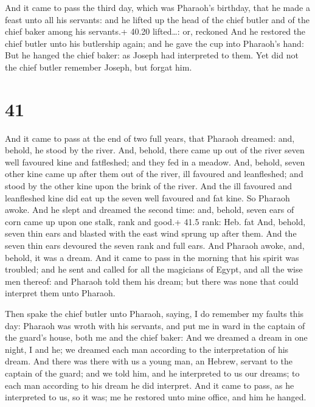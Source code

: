  And it came to pass the third day, which was Pharaoh's
birthday, that he made a feast unto all his servants: and he lifted up
the head of the chief butler and of the chief baker among his servants.+
40.20 lifted\ldots: or, reckoned  And he restored the chief
butler unto his butlership again; and he gave the cup into Pharaoh's
hand:  But he hanged the chief baker: as Joseph had
interpreted to them.  Yet did not the chief butler remember
Joseph, but forgat him.

\hypertarget{section-40}{%
\section{41}\label{section-40}}

 And it came to pass at the end of two full years, that
Pharaoh dreamed: and, behold, he stood by the river.  And,
behold, there came up out of the river seven well favoured kine and
fatfleshed; and they fed in a meadow.  And, behold, seven
other kine came up after them out of the river, ill favoured and
leanfleshed; and stood by the other kine upon the brink of the river.
 And the ill favoured and leanfleshed kine did eat up the
seven well favoured and fat kine. So Pharaoh awoke.  And he
slept and dreamed the second time: and, behold, seven ears of corn came
up upon one stalk, rank and good.+ 41.5 rank: Heb. fat  And,
behold, seven thin ears and blasted with the east wind sprung up after
them.  And the seven thin ears devoured the seven rank and
full ears. And Pharaoh awoke, and, behold, it was a dream. 
And it came to pass in the morning that his spirit was troubled; and he
sent and called for all the magicians of Egypt, and all the wise men
thereof: and Pharaoh told them his dream; but there was none that could
interpret them unto Pharaoh.

 Then spake the chief butler unto Pharaoh, saying, I do
remember my faults this day:  Pharaoh was wroth with his
servants, and put me in ward in the captain of the guard's house, both
me and the chief baker:  And we dreamed a dream in one
night, I and he; we dreamed each man according to the interpretation of
his dream.  And there was there with us a young man, an
Hebrew, servant to the captain of the guard; and we told him, and he
interpreted to us our dreams; to each man according to his dream he did
interpret.  And it came to pass, as he interpreted to us,
so it was; me he restored unto mine office, and him he hanged.


